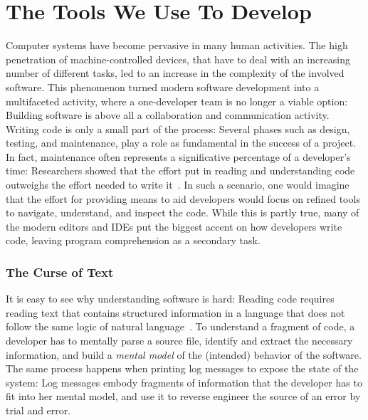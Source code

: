 \newpage


\section{The Tools We Use To Develop} \label{sec:reified-introduction}

Computer systems have become pervasive in many human activities.
The high penetration of machine-controlled devices, that have to deal with an increasing number of different tasks, led to an increase in the complexity of the involved software.
This phenomenon turned modern software development into a multifaceted activity, where a one-developer team is no longer a viable option: Building software is above all a collaboration and communication activity.
Writing code is only a small part of the process: Several phases such as design, testing, and maintenance, play a role as fundamental in the success of a project.
In fact, maintenance often represents a significative percentage of a developer's time: Researchers showed that the effort put in reading and understanding code outweighs the effort needed to write it~\cite{Corb1989,Fjel1983,Zelk1979,Mine2015b}.
In such a scenario, one would imagine that the effort for providing means to aid developers would focus on refined tools to navigate, understand, and inspect the code.
While this is partly true, many of the modern editors and IDEs put the biggest accent on how developers write code, leaving program comprehension as a secondary task.


\subsubsection{The Curse of Text}

It is easy to see why understanding software is hard: Reading code requires reading text that contains structured information in a language that does not follow the same logic of natural language~\cite{stor1999a}.
To understand a fragment of code, a developer has to mentally parse a source file, identify and extract the necessary information, and build a \emph{mental model} of the (intended) behavior of the software.
The same process happens when printing log messages to expose the state of the system: Log messages embody fragments of information that the developer has to fit into her mental model, and use it to reverse engineer the source of an error by trial and error.

